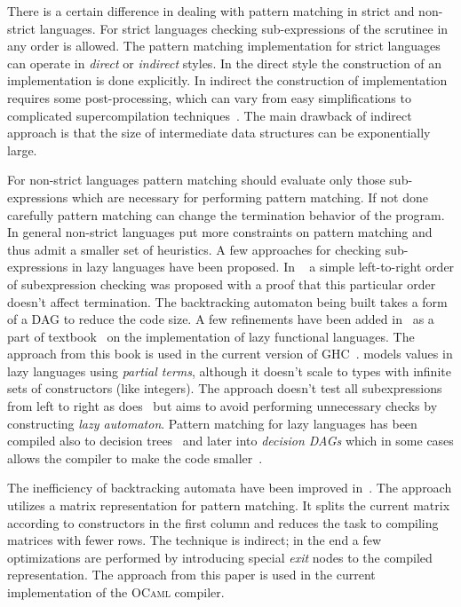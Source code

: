 There is a certain difference in dealing with pattern matching in strict and non-strict languages. For strict languages checking sub-expressions of the scrutinee in any order is allowed.
The pattern matching implementation for strict languages can operate in \emph{direct} or \emph{indirect} styles. In the direct style the construction of an implementation is done explicitly. In indirect the construction of implementation requires some post-processing, which can vary from easy simplifications to complicated supercompilation
techniques~\cite{sestoft1996}. The main drawback of indirect approach is that the size of intermediate data structures can be exponentially large.

For non-strict languages pattern matching should evaluate only those sub-expressions which are necessary for performing pattern matching. If not done carefully pattern matching can
change the termination behavior of the program. In general non-strict languages put more constraints on pattern matching and thus admit a smaller  set of heuristics. 
A few approaches for checking sub-expressions in lazy languages have been proposed. In ~\cite{augustsson1985} a simple left-to-right order of subexpression checking was proposed
with a proof that this particular order doesn't affect termination. The backtracking automaton being built takes a form of a DAG to reduce the code size. A few refinements have been added in~\cite{wadler1987}
as a part of textbook~\cite{peytonjones1987} on the implementation of lazy functional languages. The approach from this book is used in the current version of GHC~\cite{marlow2012the}.
\cite{laville1991} models values in lazy languages using \emph{partial terms}, although it doesn't scale to types with infinite sets of constructors (like integers). The approach doesn't
test all subexpressions from left to right as does~\cite{augustsson1985} but aims to  avoid performing unnecessary checks by constructing \emph{lazy automaton}. Pattern matching for
lazy languages has been compiled also to decision trees~\cite{maranget1992} and later into \emph{decision DAGs} which in some cases allows the compiler to make the code
smaller~\cite{maranget1994}.

The inefficiency of backtracking automata have been
improved in~\cite{maranget2001}. The approach utilizes a matrix representation for pattern matching. It splits the current matrix according to constructors in the
first column and reduces the task to compiling matrices with fewer rows. The technique is indirect; in the end a few optimizations are performed by introducing
special \emph{exit} nodes to the compiled representation. %
The approach from this paper is used in the current implementation of the \textsc{OCaml} compiler.

